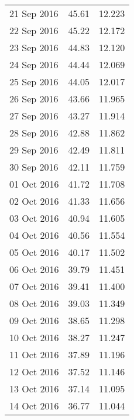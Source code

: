 \documentclass[11pt,a4paper,twoside]{article}
\begin{document}
\begin{longtable}{lcc}
21 Sep 2016                    & 45.61                & 12.223     \\
22 Sep 2016                    & 45.22                & 12.172     \\
23 Sep 2016                    & 44.83                & 12.120     \\
24 Sep 2016                    & 44.44                & 12.069     \\
25 Sep 2016                    & 44.05                & 12.017     \\
26 Sep 2016                    & 43.66                & 11.965     \\
27 Sep 2016                    & 43.27                & 11.914     \\
28 Sep 2016                    & 42.88                & 11.862     \\
29 Sep 2016                    & 42.49                & 11.811     \\
30 Sep 2016                    & 42.11                & 11.759     \\
01 Oct 2016                    & 41.72                & 11.708     \\
02 Oct 2016                    & 41.33                & 11.656     \\
03 Oct 2016                    & 40.94                & 11.605     \\
04 Oct 2016                    & 40.56                & 11.554     \\
05 Oct 2016                    & 40.17                & 11.502     \\
06 Oct 2016                    & 39.79                & 11.451     \\
07 Oct 2016                    & 39.41                & 11.400     \\
08 Oct 2016                    & 39.03                & 11.349     \\
09 Oct 2016                    & 38.65                & 11.298     \\
10 Oct 2016                    & 38.27                & 11.247     \\
11 Oct 2016                    & 37.89                & 11.196     \\
12 Oct 2016                    & 37.52                & 11.146     \\
13 Oct 2016                    & 37.14                & 11.095     \\
14 Oct 2016                    & 36.77                & 11.044     \\

\end{longtable}
\end{document}
